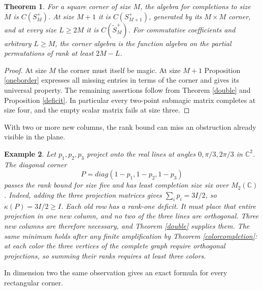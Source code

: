 \documentclass[11pt,a4paper]{article}
\newtheorem{thm}{Theorem}[section]
\newtheorem{ex}[thm]{Example}
\begin{document}
\begin{thm}
For a square corner of size $M$, the algebra for completions to size $M$ is $C(S_M^+)$. At size $M+1$ it is $C(S_{M+1}^+)$, generated by its $M\times M$ corner, and at every size $L\geq2M$ it is $C(\widetilde S_M^+)$. For commutative coefficients and arbitrary $L\geq M$, the corner algebra is the function algebra on the partial permutations of rank at least $2M-L$.
\end{thm}
\begin{proof}
At size $M$ the corner must itself be magic. At size $M+1$ Proposition \ref{oneborder} expresses all missing entries in terms of the corner and gives its universal property. The remaining assertions follow from Theorem \ref{double} and Proposition \ref{deficit}. In particular every two-point submagic matrix completes at size four, and the empty scalar matrix fails at size three.
\end{proof}

With two or more new columns, the rank bound can miss an obstruction already visible in the plane.

\begin{ex}
Let $p_1,p_2,p_3$ project onto the real lines at angles $0,\pi/3,2\pi/3$ in $\mathbb C^2$. The diagonal corner
\[
 P=diag(1-p_1,1-p_2,1-p_3)
\]
passes the rank bound for size five and has least completion size six over $M_2(\mathbb C)$. Indeed, adding the three projection matrices gives $\sum_i p_i=3I/2$, so $\kappa(P)=3I/2\geq I$. Each old row has a rank-one deficit. It must place that entire projection in one new column, and no two of the three lines are orthogonal. Three new columns are therefore necessary, and Theorem \ref{double} supplies them. The same minimum holds after any finite amplification by Theorem \ref{colorcompletion}: at each color the three vertices of the complete graph require orthogonal projections, so summing their ranks requires at least three colors.
\end{ex}

In dimension two the same observation gives an exact formula for every rectangular corner.
\end{document}
